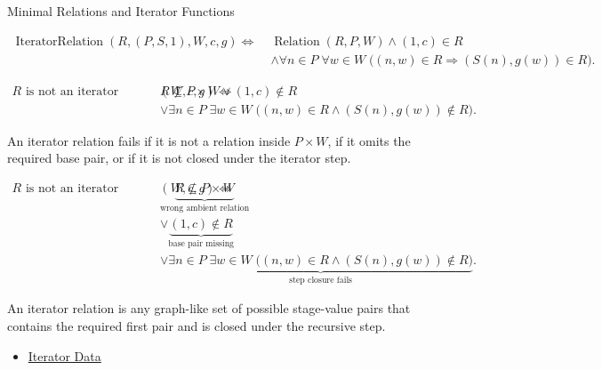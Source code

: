 \begin{topicbox}{Minimal Relations and Iterator Functions}
\begin{remark*}
\[
\begin{aligned}
\operatorname{IteratorRelation}(R,(P,S,1),W,c,g)
\Longleftrightarrow\;&
\operatorname{Relation}(R,P,W)
\land (1,c)\in R\\
&\land
\forall n\in P\;\forall w\in W\;
\bigl((n,w)\in R\Longrightarrow (S(n),g(w))\in R\bigr).
\end{aligned}
\]
\end{remark*}

\begin{remark*}
\[
\begin{aligned}
R \text{ is not an iterator relation for } (W,c,g)
\Longleftrightarrow\;&
R\not\subseteq P\times W
\lor (1,c)\notin R\\
&\lor \exists n\in P\;\exists w\in W\;
\bigl((n,w)\in R\land (S(n),g(w))\notin R\bigr).
\end{aligned}
\]
\end{remark*}

\begin{remark*}
An iterator relation fails if it is not a relation inside $P\times W$, if it
omits the required base pair, or if it is not closed under the iterator step.
\end{remark*}

\begin{remark*}
\[
\begin{aligned}
R \text{ is not an iterator relation for } (W,c,g)
\Longleftrightarrow\;&
\underbrace{R\not\subseteq P\times W}_{\text{wrong ambient relation}}\\
&\lor \underbrace{(1,c)\notin R}_{\text{base pair missing}}\\
&\lor \underbrace{\exists n\in P\;\exists w\in W\;
\bigl((n,w)\in R\land (S(n),g(w))\notin R\bigr)}_{\text{step closure fails}}.
\end{aligned}
\]
\end{remark*}

\begin{remark*}[Interpretation]
An iterator relation is any graph-like set of possible stage-value pairs that
contains the required first pair and is closed under the recursive step.
\end{remark*}

\begin{dependencies}
\begin{itemize}
  \item \hyperref[def:iterator-data-on-peano-system]{Iterator Data}
\end{itemize}
\end{dependencies}


\end{topicbox}

